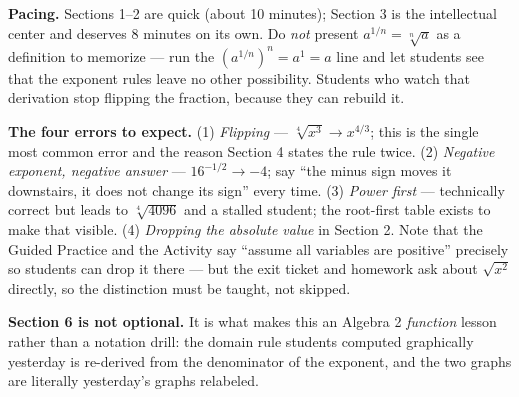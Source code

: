 \documentclass[10pt]{article}
\begin{document}
\begin{teachernote}
\textbf{Pacing.} Sections 1--2 are quick (about 10 minutes); Section 3 is the intellectual center and
deserves 8 minutes on its own. Do \emph{not} present $a^{1/n}=\sqrt[n]{a}$ as a definition to
memorize --- run the $\left(a^{1/n}\right)^n=a^{1}=a$ line and let students see that the exponent
rules leave no other possibility. Students who watch that derivation stop flipping the fraction,
because they can rebuild it.

\textbf{The four errors to expect.} (1) \emph{Flipping} --- $\sqrt[4]{x^3}\to x^{4/3}$; this is the
single most common error and the reason Section 4 states the rule twice. (2) \emph{Negative
exponent, negative answer} --- $16^{-1/2}\to-4$; say ``the minus sign moves it downstairs, it does
not change its sign'' every time. (3) \emph{Power first} --- technically correct but leads to
$\sqrt[4]{4096}$ and a stalled student; the root-first table exists to make that visible. (4)
\emph{Dropping the absolute value} in Section 2. Note that the Guided Practice and the Activity say
``assume all variables are positive'' precisely so students can drop it there --- but the exit
ticket and homework ask about $\sqrt{x^2}$ directly, so the distinction must be taught, not skipped.

\textbf{Section 6 is not optional.} It is what makes this an Algebra 2 \emph{function} lesson rather
than a notation drill: the domain rule students computed graphically yesterday is re-derived from
the denominator of the exponent, and the two graphs are literally yesterday's graphs relabeled.
\end{teachernote}
\end{document}
